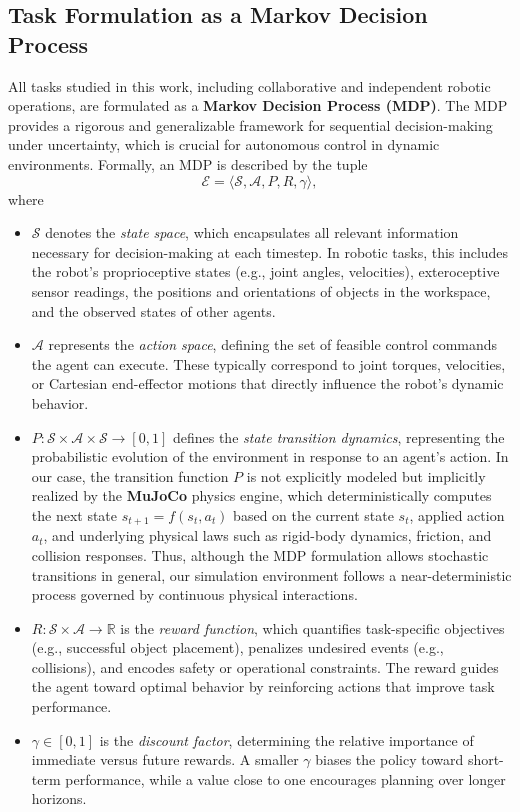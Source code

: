 \documentclass[english, 12pt, a4paper, elec, utf8, a-2b, online]{aaltothesis}
\begin{document}
\subsection{Task Formulation as a Markov Decision Process}

All tasks studied in this work, including collaborative and independent robotic operations, are formulated as a \textbf{Markov Decision Process (MDP)}. The MDP provides a rigorous and generalizable framework for sequential decision-making under uncertainty, which is crucial for autonomous control in dynamic environments. Formally, an MDP is described by the tuple
\begin{equation}
\mathcal{E} = \langle \mathcal{S}, \mathcal{A}, P, R, \gamma \rangle,
\end{equation}
where

\begin{itemize}
    \item $\mathcal{S}$ denotes the \textit{state space}, which encapsulates all relevant information necessary for decision-making at each timestep. In robotic tasks, this includes the robot's proprioceptive states (e.g., joint angles, velocities), exteroceptive sensor readings, the positions and orientations of objects in the workspace, and the observed states of other agents.
    \item $\mathcal{A}$ represents the \textit{action space}, defining the set of feasible control commands the agent can execute. These typically correspond to joint torques, velocities, or Cartesian end-effector motions that directly influence the robot’s dynamic behavior.
    \item $P: \mathcal{S} \times \mathcal{A} \times \mathcal{S} \to [0,1]$ defines the \textit{state transition dynamics}, representing the probabilistic evolution of the environment in response to an agent’s action. In our case, the transition function $P$ is not explicitly modeled but implicitly realized by the \textbf{MuJoCo} physics engine, which deterministically computes the next state $s_{t+1} = f(s_t, a_t)$ based on the current state $s_t$, applied action $a_t$, and underlying physical laws such as rigid-body dynamics, friction, and collision responses. Thus, although the MDP formulation allows stochastic transitions in general, our simulation environment follows a near-deterministic process governed by continuous physical interactions.
    \item $R: \mathcal{S} \times \mathcal{A} \to \mathbb{R}$ is the \textit{reward function}, which quantifies task-specific objectives (e.g., successful object placement), penalizes undesired events (e.g., collisions), and encodes safety or operational constraints. The reward guides the agent toward optimal behavior by reinforcing actions that improve task performance.
    \item $\gamma \in [0,1]$ is the \textit{discount factor}, determining the relative importance of immediate versus future rewards. A smaller $\gamma$ biases the policy toward short-term performance, while a value close to one encourages planning over longer horizons.
\end{itemize}
\end{document}
